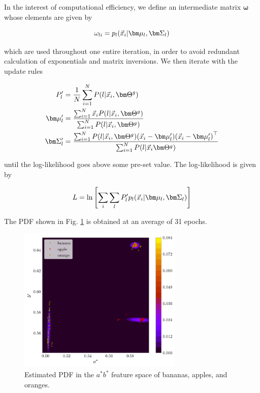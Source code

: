 \documentclass[12pt,a4paper]{article}
\begin{document}
In the interest of computational efficiency, we define an intermediate matrix $\bm\omega$ whose elements are given by

\begin{equation}
	\omega_{li} = p_l \qty(\vec{x}_i | \bm\mu_l, \bm\Sigma_l)
\end{equation}

\noindent which are used throughout one entire iteration, in order to avoid redundant calculation of exponentials and matrix inversions. We then iterate with the update rules

\begin{align}
	P_l^\prime &= \frac{1}{N} \sum_{i=1}^N P \qty(l | \vec{x}_i, \bm\Theta^g) \\
	\bm\mu_l^\prime &= \frac{\sum_{i=1}^N \vec{x}_i P \qty(l | \vec{x}_i, \bm\Theta^g)}{\sum_{i=1}^N P \qty(l | \vec{x}_i, \bm\Theta^g)} \\
	\bm\Sigma_l^\prime &= \frac{\sum_{i=1}^N P \qty(l | \vec{x}_i, \bm\Theta^g) \qty(\vec{x}_i - \bm\mu_l^\prime) \qty(\vec{x}_i - \bm\mu_l^\prime)^\top}{\sum_{i=1}^N P \qty(l | \vec{x}_i \bm\Theta^g)}
\end{align}

\noindent until the log-likelihood goes above some pre-set value. The log-likelihood is given by

\begin{equation}
	L = \ln \qty[\sum_i \sum_l P_l^\prime p_l \qty(\vec{x}_i | \bm\mu_l, \bm\Sigma_l)]
\end{equation}

\noindent The PDF shown in Fig. \ref{fig:pdf} is obtained at an average of 31 epochs.

\begin{figure}[htb]
	\centering
	\includegraphics[width=0.7\textwidth]{em-feature-space.png}
	\caption{Estimated PDF in the $a^*b^*$ feature space of bananas, apples, and oranges.}
	\label{fig:pdf}
\end{figure}
\end{document}
